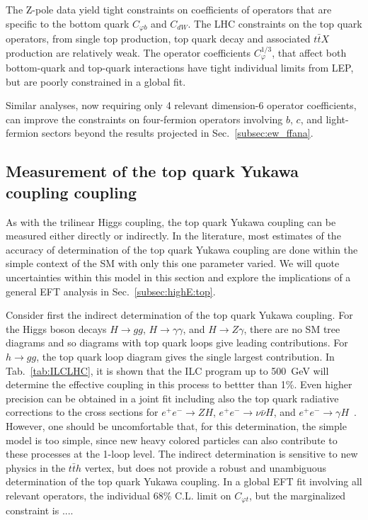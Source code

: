 The Z-pole data yield tight constraints on coefficients of operators that are specific to 
the bottom quark $C_{\varphi b}$ and $C_{dW}$. The LHC constraints on the
top quark operators, from single top production, top quark decay and associated $t\bar{t}X$ 
production are relatively weak. The operator coefficients $C^{1/3}_{\varphi}$, that affect
both bottom-quark and top-quark interactions have tight individual limits from LEP, but 
are poorly constrained in a global fit. 

Similar analyses, now requiring  only 4 relevant dimension-6 operator coefficients, can
improve the constraints on four-fermion operators involving $b$, $c$,
and light-fermion sectors beyond the results projected in
Sec.~\ref{subsec:ew_ffana}.


\subsection{Measurement of the top quark Yukawa coupling coupling}
\label{subsec:top:topYukawa}


As with the trilinear Higgs coupling, the top quark Yukawa coupling can be
measured either directly or indirectly.  In the literature, most
estimates of the accuracy of determination of the top quark Yukawa
coupling are done within the simple context of the SM with only this
one parameter varied. We will quote uncertainties
within this model in this section and explore the implications of a general 
EFT analysis in Sec.~\ref{subsec:highE:top}.

Consider first the indirect determination of the top quark Yukawa coupling.
   For the Higgs boson decays
$H\to gg$, $H\to \gamma\gamma$, and $H\to Z \gamma$, there are no SM tree
diagrams
and so diagrams with top quark loops give leading contributions.  For
$h\to gg$, the top quark loop diagram gives the single largest
contribution.   In Tab.~\ref{tab:ILCLHC}, it is shown that the ILC
program up to 
500~GeV will determine the effective coupling in this process to bettter
than 1\%. Even higher precision can be obtained in a joint fit
including also the top quark radiative corrections to the cross
sections for $e^+e^- \rightarrow ZH$, $e^+e^- \rightarrow \nu\bar\nu
H$, and $e^+e^- \to  \gamma H$~\cite{Boselli:2018zxr}. However, one
should be uncomfortable that, for this determination, the simple model is
too simple, since new heavy colored particles can also contribute to
these processes at the 1-loop level. The indirect determination is 
sensitive to new physics in the $t\bar{t}h$ vertex, but does not provide 
a robust and unambiguous determination of the top quark Yukawa coupling. 
In a global EFT fit involving all relevant operators, the individual 68\% 
C.L. limit on $C_{\varphi t}$, but the marginalized constraint is ....

